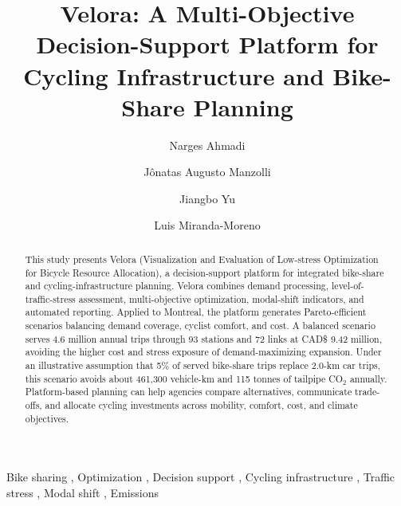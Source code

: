 \documentclass[preprint,authoryear,10pt]{elsarticle}
\begin{document}
\begin{frontmatter}

\title{Velora: A Multi-Objective Decision-Support Platform for Cycling Infrastructure and Bike-Share Planning}

    
    \author[mcgill]{Narges Ahmadi}
    
    \author[mcgill,inescc]{Jônatas Augusto Manzolli}
    
    \author[mcgill]{Jiangbo Yu}
    
    \author[mcgill]{Luis Miranda-Moreno}
    
    
    \address[mcgill]{Department of Civil Engineering, McGill University, 817 Sherbrooke Street West, Montreal, QC H3A 0C3, Canada}
    \address[inescc]{INESC Coimbra, University of Coimbra, Rua Silvio Lima, Polo II, 3030-290 Coimbra, Portugal}

\begin{abstract}

This study presents Velora (Visualization and Evaluation of Low-stress Optimization for Bicycle Resource Allocation), a decision-support platform for integrated bike-share and cycling-infrastructure planning. Velora combines demand processing, level-of-traffic-stress assessment, multi-objective optimization, modal-shift indicators, and automated reporting. Applied to Montreal, the platform generates Pareto-efficient scenarios balancing demand coverage, cyclist comfort, and cost. A balanced scenario serves 4.6 million annual trips through 93 stations and 72 links at CAD\$ 9.42 million, avoiding the higher cost and stress exposure of demand-maximizing expansion. Under an illustrative assumption that 5\% of served bike-share trips replace 2.0-km car trips, this scenario avoids about 461,300 vehicle-km and 115 tonnes of tailpipe CO$_2$ annually. Platform-based planning can help agencies compare alternatives, communicate trade-offs, and allocate cycling investments across mobility, comfort, cost, and climate objectives.

\end{abstract}

\begin{keyword}
    Bike sharing \sep 
    Optimization \sep 
    Decision support \sep
    Cycling infrastructure \sep 
    Traffic stress \sep 
    Modal shift \sep
    Emissions
\end{keyword}

\end{frontmatter}
\end{document}
